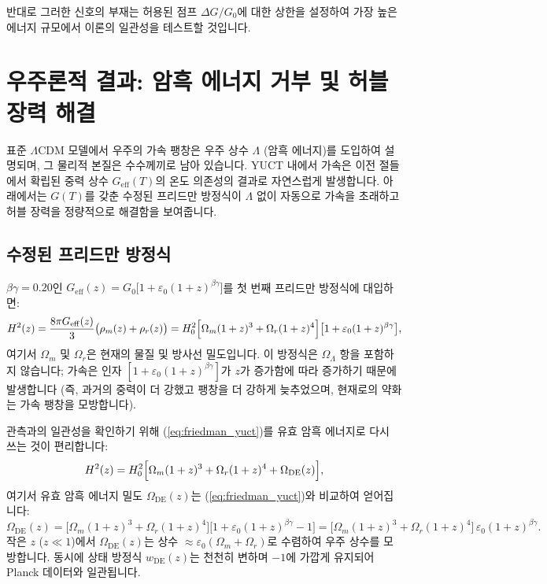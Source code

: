 \documentclass[11pt,a4paper]{article}
\begin{document}
	반대로 그러한 신호의 부재는 허용된 점프 $\Delta G/G_0$에 대한 상한을 설정하여 가장 높은 에너지 규모에서 이론의 일관성을 테스트할 것입니다.
	
	\section{우주론적 결과: 암흑 에너지 거부 및 허블 장력 해결}
	\label{sec:cosmo-consequences}
	
	표준 $\Lambda$CDM 모델에서 우주의 가속 팽창은 우주 상수 $\Lambda$ (암흑 에너지)를 도입하여 설명되며, 그 물리적 본질은 수수께끼로 남아 있습니다. YUCT 내에서 가속은 이전 절들에서 확립된 중력 상수 $G_{\mathrm{eff}}(T)$의 온도 의존성의 결과로 자연스럽게 발생합니다. 아래에서는 $G(T)$를 갖춘 수정된 프리드만 방정식이 $\Lambda$ 없이 자동으로 가속을 초래하고 허블 장력을 정량적으로 해결함을 보여줍니다.
	
	\subsection{수정된 프리드만 방정식}
	
	$\beta\gamma = 0.20$인 $G_{\mathrm{eff}}(z) = G_0\bigl[1 + \varepsilon_0 (1+z)^{\beta\gamma}\bigr]$를 첫 번째 프리드만 방정식에 대입하면:
	\begin{equation}
		H^2(z) = \frac{8\pi G_{\mathrm{eff}}(z)}{3} \bigl(\rho_m(z) + \rho_r(z)\bigr) = H_0^2\Bigl[\Omega_m (1+z)^3 + \Omega_r (1+z)^4\Bigr]\bigl[1 + \varepsilon_0 (1+z)^{\beta\gamma}\bigr],
		\label{eq:friedman_yuct}
	\end{equation}
	여기서 $\Omega_m$ 및 $\Omega_r$은 현재의 물질 및 방사선 밀도입니다. 이 방정식은 $\Omega_\Lambda$ 항을 포함하지 않습니다; 가속은 인자 $[1 + \varepsilon_0 (1+z)^{\beta\gamma}]$가 $z$가 증가함에 따라 증가하기 때문에 발생합니다 (즉, 과거의 중력이 더 강했고 팽창을 더 강하게 늦추었으며, 현재로의 약화는 가속 팽창을 모방합니다).
	
	관측과의 일관성을 확인하기 위해 (\ref{eq:friedman_yuct})를 유효 암흑 에너지로 다시 쓰는 것이 편리합니다:
	\begin{equation}
		H^2(z) = H_0^2\Bigl[\Omega_m (1+z)^3 + \Omega_r (1+z)^4 + \Omega_{\mathrm{DE}}(z)\Bigr],
		\label{eq:effective_de}
	\end{equation}
	여기서 유효 암흑 에너지 밀도 $\Omega_{\mathrm{DE}}(z)$는 (\ref{eq:friedman_yuct})와 비교하여 얻어집니다:
	\begin{equation}
		\Omega_{\mathrm{DE}}(z) = \bigl[\Omega_m (1+z)^3 + \Omega_r (1+z)^4\bigr]\bigl[1 + \varepsilon_0 (1+z)^{\beta\gamma} - 1\bigr] = \bigl[\Omega_m (1+z)^3 + \Omega_r (1+z)^4\bigr]\,\varepsilon_0 (1+z)^{\beta\gamma}.
		\label{eq:de_yuct}
	\end{equation}
	작은 $z$ ($z \ll 1$)에서 $\Omega_{\mathrm{DE}}(z)$는 상수 $\approx \varepsilon_0 (\Omega_m + \Omega_r)$로 수렴하여 우주 상수를 모방합니다. 동시에 상태 방정식 $w_{\mathrm{DE}}(z)$는 천천히 변하며 $-1$에 가깝게 유지되어 Planck 데이터와 일관됩니다.
	
\end{document}
